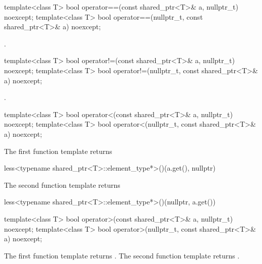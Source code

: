 %
\begin{itemdecl}
template<class T>
  bool operator==(const shared_ptr<T>& a, nullptr_t) noexcept;
template<class T>
  bool operator==(nullptr_t, const shared_ptr<T>& a) noexcept;
\end{itemdecl}

\begin{itemdescr}
\pnum
\returns {}.
\end{itemdescr}

%
\begin{itemdecl}
template<class T>
  bool operator!=(const shared_ptr<T>& a, nullptr_t) noexcept;
template<class T>
  bool operator!=(nullptr_t, const shared_ptr<T>& a) noexcept;
\end{itemdecl}

\begin{itemdescr}
\pnum
\returns {}.
\end{itemdescr}

%
\begin{itemdecl}
template<class T>
  bool operator<(const shared_ptr<T>& a, nullptr_t) noexcept;
template<class T>
  bool operator<(nullptr_t, const shared_ptr<T>& a) noexcept;
\end{itemdecl}

\begin{itemdescr}
\pnum
\returns
The first function template returns
\begin{codeblock}
less<typename shared_ptr<T>::element_type*>()(a.get(), nullptr)
\end{codeblock}
The second function template returns
\begin{codeblock}
less<typename shared_ptr<T>::element_type*>()(nullptr, a.get())
\end{codeblock}
\end{itemdescr}

%
\begin{itemdecl}
template<class T>
  bool operator>(const shared_ptr<T>& a, nullptr_t) noexcept;
template<class T>
  bool operator>(nullptr_t, const shared_ptr<T>& a) noexcept;
\end{itemdecl}

\begin{itemdescr}
\pnum
\returns
The first function template returns .
The second function template returns .
\end{itemdescr}

